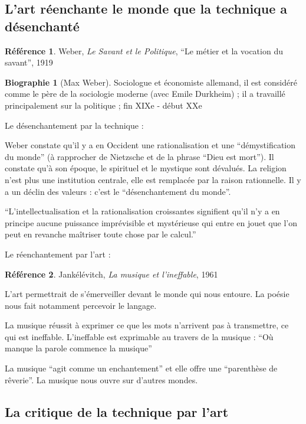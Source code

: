 \documentclass[french]{book}
\theoremstyle{definition}
\newtheorem*{refe}{Référence}
\newtheorem*{bio}{Biographie}
\begin{document}
\subsection{L’art réenchante le monde que la technique a désenchanté}

\begin{refe}
	Weber, \textit{Le Savant et le Politique}, “Le métier et la vocation du savant”, 1919
\end{refe}

\begin{bio}[Max Weber]
	Sociologue et économiste allemand, il est considéré comme le père de la sociologie moderne (avec Emile Durkheim) ; il a travaillé principalement sur la politique ; fin XIXe - début XXe
\end{bio}
Le désenchantement par la technique :

Weber constate qu’il y a en Occident une rationalisation et une “démystification du monde” (à rapprocher de Nietzsche et de la phrase “Dieu est mort”). Il constate qu’à son époque, le spirituel et le mystique sont dévalués. La religion n’est plus une institution centrale, elle est remplacée par la raison rationnelle. Il y a un déclin des valeurs : c’est le “désenchantement du monde”.

“L’intellectualisation et la rationalisation croissantes signifient qu’il n’y a en principe aucune puissance imprévisible et mystérieuse qui entre en jouet que l’on peut en revanche maîtriser toute chose par le calcul.”


Le réenchantement par l’art :

\begin{refe}
	Jankélévitch, \textit{La musique et l’ineffable}, 1961
\end{refe}

L’art permettrait de s’émerveiller devant le monde qui nous entoure. La poésie nous fait notamment percevoir le langage.

La musique réussit à exprimer ce que les mots n’arrivent pas à transmettre, ce qui est ineffable. L’ineffable est exprimable au travers de la musique :
“Où manque la parole commence la musique”

La musique “agit comme un enchantement” et elle offre une “parenthèse de rêverie”. La musique nous ouvre sur d’autres mondes.

\subsection{La critique de la technique par l’art}
\end{document}
